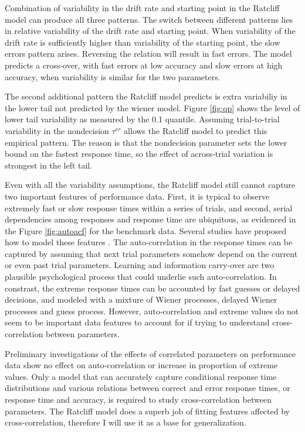 \documentclass[12pt]{article}
\begin{document}
Combination of variability in the drift rate and starting point in the Ratcliff model can produce all three patterns. The switch between different patterns lies in relative variability of the drift rate and starting point. When variability of the drift rate is sufficiently higher than variability of the starting point, the slow errors pattern arises. Reversing the relation will result in fast errors. The model predicts a cross-over, with fast errors at low accuracy and slow errors at high accuracy, when variability is similar for the two parameters.

The second additional pattern the Ratcliff model predicts is extra variabiliy in the lower tail not predicted by the wiener model. Figure \ref{fig:qp} shows the level of lower tail variability as measured by the 0.1 quantile. Assuming trial-to-trial variability in the nondecision $\tau^{er}$ allows the Ratcliff model to predict this empirical pattern. The reason is that the nondecision parameter sets the lower bound on the fastest response time, so the effect of across-trial variation is strongest in the left tail. 

Even with all the variability assumptions, the Ratcliff model still cannot capture two important
features of performance data. First, it is typical to observe extremely fast or slow response times within a series of trials, and second, serial dependencies among responses and response time are ubiquitous, as evidenced in the Figure \ref{fig:autoacf} for the benchmark data. Several studies have proposed how to model these features \citep{RatTue2002,VanTue2007,GaoWon2009,CraPer2010,JonCur2013}. The auto-correlation in the response times can be captured by assuming that next trial parameters somehow depend on the current or even past trial parameters. Learning and information carry-over are two plausible psychological process that could underlie such auto-correlation.
In constrast, the extreme response times can be accounted by fast guesses or delayed decisions, and modeled with a mixture of Wiener processes, delayed Wiener processes and guess process. However, auto-correlation and extreme values do not seem to be important data features to account for if trying to understand cross-correlation between parameters.

Preliminary investigations of the effects of correlated parameters on performance data show no effect on auto-correlation or increase in proportion of extreme values. Only a model that can accurately capture conditional response time distributions and various relations between correct and error response times, or response time and accuracy, is required to study cross-correlation between parameters. The Ratcliff model does a superb job of fitting features affected by cross-correlation, therefore I will use it as a base for generalization.
    
\end{document}
